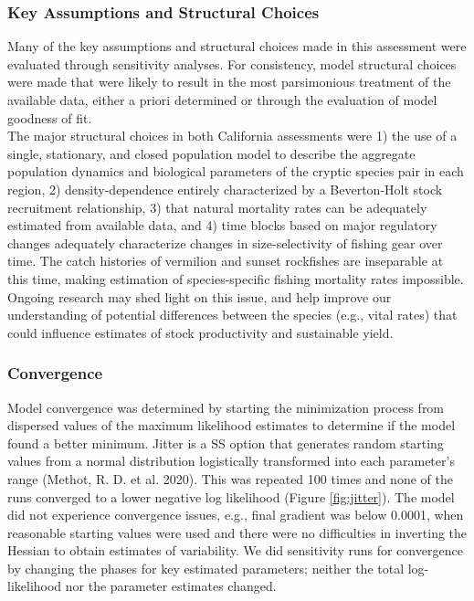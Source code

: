 \documentclass[
  english,
  a4paper,
]{article}
\begin{document}
\hypertarget{key-assumptions-and-structural-choices}{%
\subsubsection{Key Assumptions and Structural Choices}\label{key-assumptions-and-structural-choices}}

Many of the key assumptions and structural choices made in this assessment were evaluated through sensitivity analyses. For consistency, model structural choices were made that were likely to result in the most parsimonious treatment of the available data, either a priori determined or through the evaluation of model goodness of fit.\\
The major structural choices in both California assessments were 1) the use of a single, stationary, and closed population model to describe the aggregate population dynamics and biological parameters of the cryptic species pair in each region, 2) density-dependence entirely characterized by a Beverton-Holt stock recruitment relationship, 3) that natural mortality rates can be adequately estimated from available data, and 4) time blocks based on major regulatory changes adequately characterize changes in size-selectivity of fishing gear over time. The catch histories of vermilion and sunset rockfishes are inseparable at this time, making estimation of species-specific fishing mortality rates impossible. Ongoing research may shed light on this issue, and help improve our understanding of potential differences between the species (e.g., vital rates) that could influence estimates of stock productivity and sustainable yield.

\hypertarget{convergence}{%
\subsubsection{Convergence}\label{convergence}}

Model convergence was determined by starting the minimization process from dispersed
values of the maximum likelihood estimates to determine if the model found a better
minimum. Jitter is a SS option that generates random starting values from a normal
distribution logistically transformed into each parameter's range (Methot, R. D. et al. 2020). This
was repeated 100 times and none of the runs converged to a lower negative log likelihood (Figure \ref{fig:jitter}).
The model did not experience convergence issues, e.g., final gradient was below 0.0001,
when reasonable starting values were used and there were no difficulties in inverting
the Hessian to obtain estimates of variability. We did sensitivity runs for
convergence by changing the phases for key estimated parameters; neither the total
log-likelihood nor the parameter estimates changed.
\end{document}
